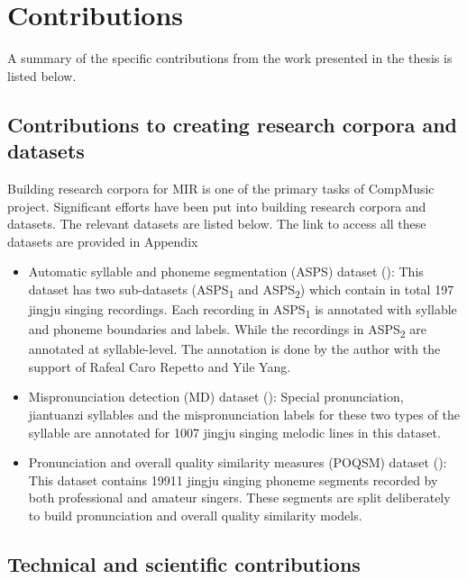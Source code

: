 \section{Contributions}

A summary of the specific contributions from the work presented in the thesis is listed below.

\subsection{Contributions to creating research corpora and datasets}

Building research corpora for MIR is one of the primary tasks of CompMusic project. Significant efforts have been put into building research corpora and datasets. The relevant datasets are listed below. The link to access all these datasets are provided in Appendix

\begin{itemize}[leftmargin=*]
\item Automatic syllable and phoneme segmentation (ASPS) dataset (): This dataset has two sub-datasets (ASPS\textsubscript{1} and ASPS\textsubscript{2}) which contain in total 197 jingju singing recordings. Each recording in ASPS\textsubscript{1} is annotated with syllable and phoneme boundaries and labels. While the recordings in ASPS\textsubscript{2} are annotated at syllable-level. The annotation is done by the author with the support of Rafeal Caro Repetto and Yile Yang.
\item Mispronunciation detection (MD) dataset (): Special pronunciation, jiantuanzi syllables and the mispronunciation labels for these two types of the syllable are annotated for 1007 jingju singing melodic lines in this dataset.
\item Pronunciation and overall quality similarity measures (POQSM) dataset (): This dataset contains 19911 jingju singing phoneme segments recorded by both professional and amateur singers. These segments are split deliberately to build pronunciation and overall quality similarity models.
\end{itemize}

\subsection{Technical and scientific contributions}

